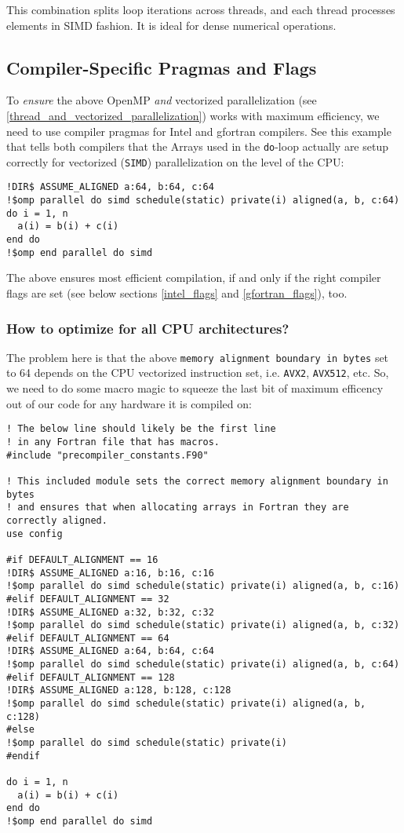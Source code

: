 \documentclass{article}
\begin{document}
This combination splits loop iterations across threads, and each thread processes elements in SIMD fashion. It is ideal for dense numerical operations.

\subsection{Compiler-Specific Pragmas and Flags}

To \emph{ensure} the above OpenMP \emph{and} vectorized parallelization (see
\ref{thread_and_vectorized_parallelization}) works with maximum efficiency, we
need to use compiler pragmas for Intel and gfortran compilers. See this example
that tells both compilers that the Arrays used in the \texttt{do}-loop actually
are setup correctly for vectorized (\texttt{SIMD}) parallelization on the level
of the CPU:

\begin{verbatim}
!DIR$ ASSUME_ALIGNED a:64, b:64, c:64
!$omp parallel do simd schedule(static) private(i) aligned(a, b, c:64)
do i = 1, n
  a(i) = b(i) + c(i)
end do
!$omp end parallel do simd
\end{verbatim}

The above ensures most efficient compilation, if and only if the right compiler
flags are set (see below sections \ref{intel_flags} and \ref{gfortran_flags}),
too.

\subsubsection{How to optimize for all CPU architectures?}
\label{simd_architecture_macros}

The problem here is that the above \texttt{memory alignment boundary in bytes}
set to 64 depends on the CPU vectorized instruction set, i.e. \texttt{AVX2},
\texttt{AVX512}, etc. So, we need to do some macro magic to squeeze the last
bit of maximum efficency out of our code for any hardware it is compiled on:

\begin{verbatim}
! The below line should likely be the first line
! in any Fortran file that has macros.
#include "precompiler_constants.F90"

! This included module sets the correct memory alignment boundary in bytes
! and ensures that when allocating arrays in Fortran they are correctly aligned.
use config

#if DEFAULT_ALIGNMENT == 16
!DIR$ ASSUME_ALIGNED a:16, b:16, c:16
!$omp parallel do simd schedule(static) private(i) aligned(a, b, c:16)
#elif DEFAULT_ALIGNMENT == 32
!DIR$ ASSUME_ALIGNED a:32, b:32, c:32
!$omp parallel do simd schedule(static) private(i) aligned(a, b, c:32)
#elif DEFAULT_ALIGNMENT == 64
!DIR$ ASSUME_ALIGNED a:64, b:64, c:64
!$omp parallel do simd schedule(static) private(i) aligned(a, b, c:64)
#elif DEFAULT_ALIGNMENT == 128
!DIR$ ASSUME_ALIGNED a:128, b:128, c:128
!$omp parallel do simd schedule(static) private(i) aligned(a, b, c:128)
#else
!$omp parallel do simd schedule(static) private(i)
#endif

do i = 1, n
  a(i) = b(i) + c(i)
end do
!$omp end parallel do simd
\end{verbatim}
\end{document}
